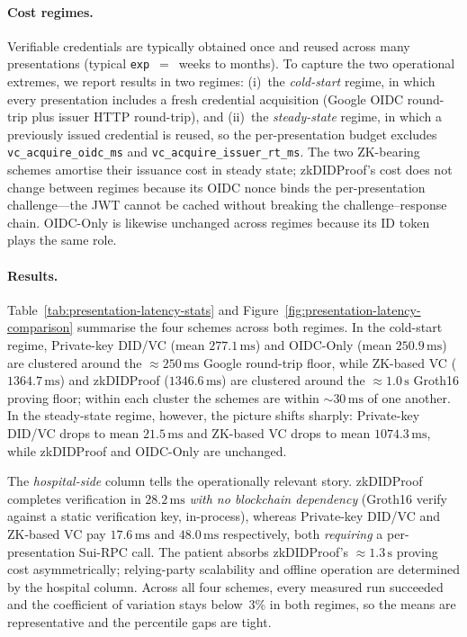 \paragraph{Cost regimes.}
Verifiable credentials are typically obtained once and reused across many
presentations (typical \texttt{exp}~$=$~weeks to months). To capture the two
operational extremes, we report results in two regimes:
(i)~the \emph{cold-start} regime, in which every presentation includes a
fresh credential acquisition (Google OIDC round-trip plus issuer HTTP
round-trip), and (ii)~the \emph{steady-state} regime, in which a previously
issued credential is reused, so the per-presentation budget excludes
\texttt{vc\_acquire\_oidc\_ms} and \texttt{vc\_acquire\_issuer\_rt\_ms}.
The two ZK-bearing schemes amortise their issuance cost in steady state;
\textsf{zkDIDProof}'s cost does not change between regimes because its
OIDC nonce binds the per-presentation challenge---the JWT cannot be cached
without breaking the challenge--response chain. \textsf{OIDC-Only} is
likewise unchanged across regimes because its ID token plays the same
role.

\paragraph{Results.}
Table~\ref{tab:presentation-latency-stats} and
Figure~\ref{fig:presentation-latency-comparison} summarise the four schemes
across both regimes. In the cold-start regime,
\textsf{Private-key DID/VC} (mean $277.1\,\mathrm{ms}$) and
\textsf{OIDC-Only} (mean $250.9\,\mathrm{ms}$) are clustered around the
$\approx 250\,\mathrm{ms}$ Google round-trip floor, while
\textsf{ZK-based VC} ($1364.7\,\mathrm{ms}$) and \textsf{zkDIDProof}
($1346.6\,\mathrm{ms}$) are clustered around the $\approx 1.0\,\mathrm{s}$
Groth16 proving floor; within each cluster the schemes are within $\sim 30\,\mathrm{ms}$
of one another. In the steady-state regime, however, the picture shifts
sharply: \textsf{Private-key DID/VC} drops to mean $21.5\,\mathrm{ms}$ and
\textsf{ZK-based VC} drops to mean $1074.3\,\mathrm{ms}$, while
\textsf{zkDIDProof} and \textsf{OIDC-Only} are unchanged.

The \emph{hospital-side} column tells the operationally relevant story.
\textsf{zkDIDProof} completes verification in $28.2\,\mathrm{ms}$
\emph{with no blockchain dependency} (Groth16 verify against a static
verification key, in-process), whereas \textsf{Private-key DID/VC} and
\textsf{ZK-based VC} pay $17.6\,\mathrm{ms}$ and $48.0\,\mathrm{ms}$
respectively, both \emph{requiring} a per-presentation Sui-RPC call. The
patient absorbs \textsf{zkDIDProof}'s $\approx 1.3\,\mathrm{s}$ proving cost
asymmetrically; relying-party scalability and offline operation are
determined by the hospital column. Across all four schemes, every measured
run succeeded and the coefficient of variation stays below~$3\%$ in both
regimes, so the means are representative and the percentile gaps are tight.

